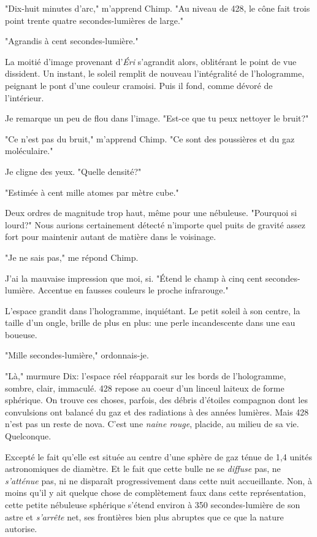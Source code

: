 "Dix-huit minutes d’arc," m'apprend Chimp. "Au niveau de 428, le cône fait trois point trente quatre secondes-lumières de large."

"Agrandis à cent secondes-lumière."

La moitié d’image provenant d'\emph{Éri} s'agrandit alors, oblitérant le point de vue dissident. Un instant, le soleil remplit de nouveau l'intégralité de l'ho\-lo\-gram\-me, peignant le pont d'une couleur cramoisi. Puis il fond, comme dévoré de l'intérieur.

Je remarque un peu de flou dans l'image. "Est-ce que tu peux nettoyer le bruit?"

"Ce n'est pas du bruit," m'apprend Chimp. "Ce sont des poussières et du gaz moléculaire."

Je cligne des yeux. "Quelle densité?"

"Estimée à cent mille atomes par mètre cube."

Deux ordres de magnitude trop haut, même pour une nébuleuse. "Pourquoi si lourd?" Nous aurions certainement détecté n'importe quel puits de gravité assez fort pour maintenir autant de matière dans le voisinage.

"Je ne sais pas," me répond Chimp.

J'ai la mauvaise impression que moi, si. "Étend le champ à cinq cent se\-con\-des-lumière. Accentue en fausses couleurs le proche infrarouge."

L'espace grandit dans l'hologramme, inquiétant. Le petit soleil à son cen\-tre, la taille d'un ongle, brille de plus en plus: une perle incandescente dans une eau boueuse.

"Mille secondes-lumière," ordonnais-je.

"Là," murmure Dix: l'espace réel réapparait sur les bords de l'holo\-gram\-me, sombre, clair, immaculé. 428 repose au coeur d'un linceul laiteux de forme sphérique. On trouve ces choses, parfois, des débris d'étoiles compagnon dont les convulsions ont balancé du gaz et des radiations à des années lumières. Mais 428 n'est pas un reste de nova. C'est une \emph{naine rouge}, placide, au milieu de sa vie. Quelconque.

Excepté le fait qu'elle est située au centre d'une sphère de gaz ténue de 1,4 unités astronomiques de diamètre. Et le fait que cette bulle ne se \emph{diffuse} pas, ne \emph{s'atténue} pas, ni ne disparaît progressivement dans cette nuit accueillante. Non, à moins qu'il y ait quelque chose de complètement faux dans cette représentation, cette petite nébuleuse sphérique s'étend environ à 350 secondes-lumière de son astre et \emph{s'arrête} net, ses frontières bien plus abruptes que ce que la nature autorise.

